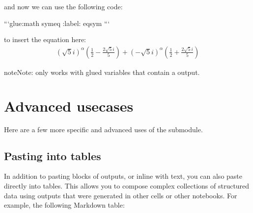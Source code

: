 \documentclass[letterpaper,10pt,english]{jupyterBook}
\begin{document}
\sphinxAtStartPar
and now we can use the following code:

\begin{sphinxVerbatim}[commandchars=\\\{\}]
```\PYGZob{}glue:math\PYGZcb{} sym\PYGZus{}eq
:label: eq\PYGZhy{}sym
```
\end{sphinxVerbatim}

\sphinxAtStartPar
to insert the equation here:
\begin{equation}\label{equation:index:eq-sym}
\begin{split}\displaystyle \left(\sqrt{5} i\right)^{\alpha} \left(\frac{1}{2} - \frac{2 \sqrt{5} i}{5}\right) + \left(- \sqrt{5} i\right)^{\alpha} \left(\frac{1}{2} + \frac{2 \sqrt{5} i}{5}\right)\end{split}
\end{equation}
\begin{sphinxadmonition}{note}{Note:}
\sphinxAtStartPar
{} only works with glued variables that contain a  output.
\end{sphinxadmonition}


\section{Advanced  use\sphinxhyphen{}cases}
\label{\detokenize{overview:advanced-glue-use-cases}}
\sphinxAtStartPar
Here are a few more specific and advanced uses of the  submodule.


\subsection{Pasting into tables}
\label{\detokenize{overview:pasting-into-tables}}
\sphinxAtStartPar
In addition to pasting blocks of outputs, or in\sphinxhyphen{}line with text, you can also paste directly
into tables. This allows you to compose complex collections of structured data using outputs
that were generated in other cells or other notebooks. For example, the following Markdown table:
\end{document}
